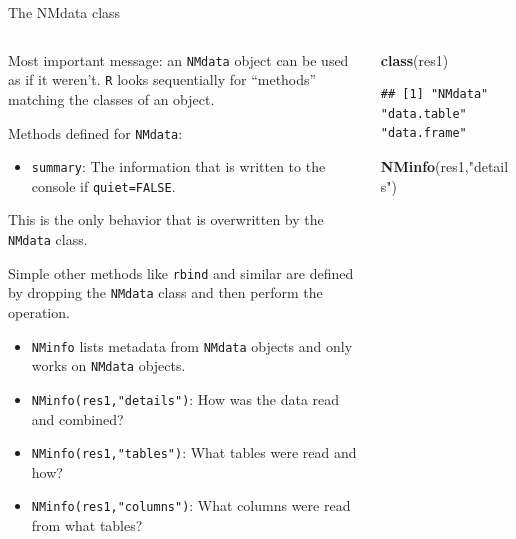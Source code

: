 \documentclass[
  8pt,
  ignorenonframetext,
  aspectratio=169]{beamer}
\newenvironment{Shaded}{\begin{snugshade}}{\end{snugshade}}
\newcommand{\KeywordTok}[1]{\textcolor[rgb]{0.13,0.29,0.53}{\textbf{#1}}}
\newcommand{\NormalTok}[1]{#1}
\newcommand{\StringTok}[1]{\textcolor[rgb]{0.31,0.60,0.02}{#1}}
\providecommand{\tightlist}{%
  \setlength{\itemsep}{0pt}\setlength{\parskip}{0pt}}
\begin{document}
\begin{frame}[fragile]{The NMdata class}
\protect\hypertarget{the-nmdata-class}{}
\begin{columns}[T]
\begin{column}{0.48\textwidth}
Most important message: an \texttt{NMdata} object can be used as if it
weren't. \texttt{R} looks sequentially for ``methods'' matching the
classes of an object.

Methods defined for \texttt{NMdata}:

\begin{itemize}
\tightlist
\item
  \texttt{summary}: The information that is written to the console if
  \texttt{quiet=FALSE}.
\end{itemize}

This is the only behavior that is overwritten by the \texttt{NMdata}
class.

Simple other methods like \texttt{rbind} and similar are defined by
dropping the \texttt{NMdata} class and then perform the operation.

\begin{itemize}
\tightlist
\item
  \texttt{NMinfo} lists metadata from \texttt{NMdata} objects and only
  works on \texttt{NMdata} objects.
\item
  \texttt{NMinfo(res1,"details")}: How was the data read and combined?
\item
  \texttt{NMinfo(res1,"tables")}: What tables were read and how?
\item
  \texttt{NMinfo(res1,"columns")}: What columns were read from what
  tables?
\end{itemize}
\end{column}

\begin{column}{0.48\textwidth}
\scriptsize

\begin{Shaded}
\begin{Highlighting}[]
\KeywordTok{class}\NormalTok{(res1)}
\end{Highlighting}
\end{Shaded}

\begin{verbatim}
## [1] "NMdata"     "data.table" "data.frame"
\end{verbatim}

\begin{Shaded}
\begin{Highlighting}[]
\KeywordTok{NMinfo}\NormalTok{(res1,}\StringTok{"details"}\NormalTok{)}
\end{Highlighting}
\end{Shaded}


\end{column}
\end{columns}
\end{frame}
\end{document}
